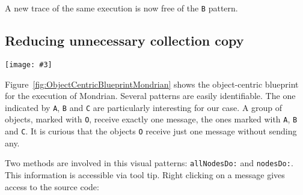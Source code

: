 \documentclass[10pt, conference, compsocconf]{IEEEtran}
\newcommand{\ct}{\lstinline[backgroundcolor=\color{white},basicstyle=\footnotesize\ttfamily]}
\newcommand{\largefig}[4]{
	\begin{figure*}[#1]
		\centering
		\texttt{[image: \#3]}
		\caption{\label{fig:#3}#4}
	\end{figure*}}
\newcommand{\figref}[1]{Figure~\ref{fig:#1}}
\begin{document}
A new trace of the same execution is now free of the \ct{B} pattern.

%
%
%

\subsection{Reducing unnecessary collection copy}

\largefig{}{1.0}{ObjectCentricBlueprintMondrian}{Reducing unnecessary calls}

\figref{ObjectCentricBlueprintMondrian} shows the object-centric blueprint for the execution of Mondrian. Several patterns are easily identifiable. The one indicated by \ct{A}, \ct{B} and \ct{C} are particularly interesting for our case. A group of objects, marked with \ct{O}, receive exactly one message, the ones marked with \ct{A}, \ct{B} and \ct{C}. It is curious that the objects \ct{O} receive just one message without sending any.

Two methods are involved in this visual patterns: \ct{allNodesDo:} and \ct{nodesDo:}. This information is accessible via tool tip. Right clicking on a message gives access to the source code:
\end{document}
